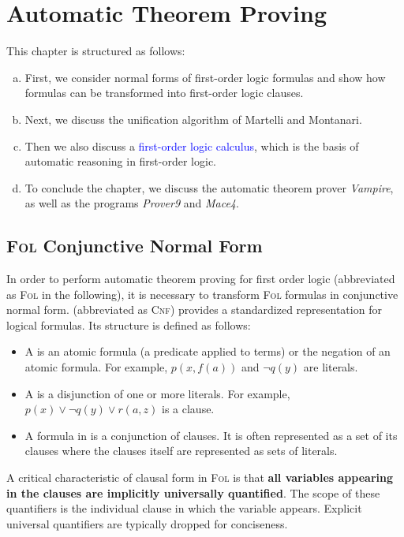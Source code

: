 \chapter{Automatic Theorem Proving}
This chapter is structured as follows:
\begin{enumerate}[(a)]
\item First, we consider normal forms of first-order logic formulas and show how formulas
      can be transformed into first-order logic clauses.
\item Next, we discuss the unification algorithm of Martelli and Montanari.
\item Then we also discuss a \textcolor{blue}{first-order logic calculus}, which is the basis
      of automatic reasoning in first-order logic.
\item To conclude the chapter, we discuss the automatic theorem prover \textsl{Vampire}, as well as
      the programs \textsl{Prover9} and \textsl{Mace4}.
\end{enumerate}

\section{\textsc{Fol} Conjunctive Normal Form}
In order to perform automatic theorem proving for first order logic (abbreviated as \textsc{Fol} in the
following), it is necessary to transform \textsc{Fol} formulas in conjunctive normal form.
 (abbreviated as \textsc{Cnf}) provides a standardized
representation for logical formulas. Its structure is defined as follows: 
\begin{itemize}
\item A  is an atomic formula (a predicate applied to terms) or the negation of an
      atomic formula. For example, $p(x, f(a))$ and $\neg q(y)$ are literals. 
\item A  is a disjunction of one or more literals. For example,
      $p(x) \lor \neg q(y) \lor r(a,z)$ is a clause. 
\item A formula in  is a conjunction of clauses. It is often represented as a set of its clauses
      where the clauses itself are represented as sets of literals.
\end{itemize}
A critical characteristic of clausal form in \textsc{Fol} is that \textbf{all variables appearing in the clauses are implicitly universally quantified}. The scope of these quantifiers is the individual clause in which the variable appears. Explicit universal quantifiers are typically dropped for conciseness.

